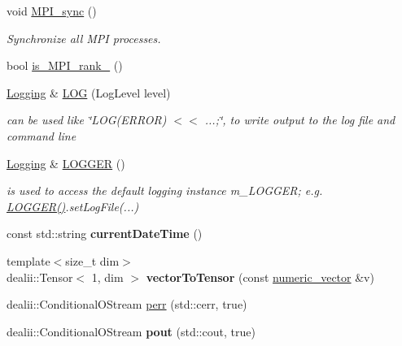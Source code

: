 \begin{DoxyCompactItemize}
\item 
\hypertarget{namespacenatrium_ad9280c1cdcb421c6bf3f719ae2747120}{
void \hyperlink{namespacenatrium_ad9280c1cdcb421c6bf3f719ae2747120}{MPI\_\-sync} ()}
\label{namespacenatrium_ad9280c1cdcb421c6bf3f719ae2747120}

\begin{DoxyCompactList}\small\item\em Synchronize all MPI processes. \item\end{DoxyCompactList}\item 
bool \hyperlink{namespacenatrium_a791202a0d8b6bdac2c62f3ae63905a36}{is\_\-MPI\_\-rank\_} ()
\item 
\hyperlink{classnatrium_1_1Logging}{Logging} \& \hyperlink{namespacenatrium_ad2838e1bab766ae66a68aa1ac6f2f7cb}{LOG} (LogLevel level)
\begin{DoxyCompactList}\small\item\em can be used like \char`\"{}LOG(ERROR) $<$$<$ ...;\char`\"{}, to write output to the log file and command line \item\end{DoxyCompactList}\item 
\hyperlink{classnatrium_1_1Logging}{Logging} \& \hyperlink{namespacenatrium_addbc7112675b740db86c1c775fce7b1d}{LOGGER} ()
\begin{DoxyCompactList}\small\item\em is used to access the default logging instance m\_\-LOGGER; e.g. \hyperlink{namespacenatrium_addbc7112675b740db86c1c775fce7b1d}{LOGGER()}.setLogFile(...) \item\end{DoxyCompactList}\item 
\hypertarget{namespacenatrium_acdc05b9a9596bba608cb1af116a15538}{
const std::string {\bfseries currentDateTime} ()}
\label{namespacenatrium_acdc05b9a9596bba608cb1af116a15538}

\item 
\hypertarget{namespacenatrium_ae701d55b10027c6e5affa8bf49f9d87f}{
{\footnotesize template$<$size\_\-t dim$>$ }\\dealii::Tensor$<$ 1, dim $>$ {\bfseries vectorToTensor} (const \hyperlink{namespacenatrium_a67c39077adc6634f8fa3762b8eef24c4}{numeric\_\-vector} \&v)}
\label{namespacenatrium_ae701d55b10027c6e5affa8bf49f9d87f}

\item 
dealii::ConditionalOStream \hyperlink{namespacenatrium_a5493e61c5fe1935bc9975d78a24dceda}{perr} (std::cerr, true)
\item 
\hypertarget{namespacenatrium_af2d0f99c55fb56378ad9d31eedd3e45d}{
dealii::ConditionalOStream {\bfseries pout} (std::cout, true)}
\label{namespacenatrium_af2d0f99c55fb56378ad9d31eedd3e45d}


\end{DoxyCompactItemize}
